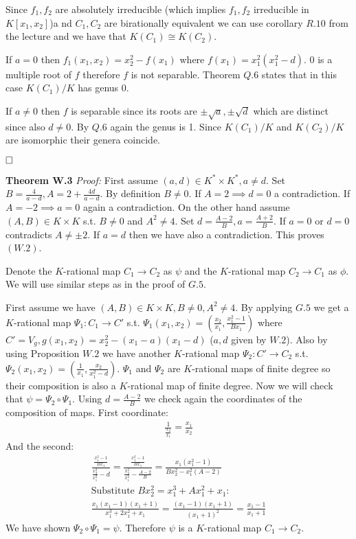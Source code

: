 \documentclass[12pt, a4paper]{article}
\newcommand{\qed}{\hfill\square}
\begin{document}
Since $f_1, f_2$ are absolutely irreducible (which implies $f_1,f_2$ irreducible in $K[x_1,x_2]$)a nd $C_1,C_2$ are birationally equivalent we can use corollary $R.10$ from the lecture and we have that $K(C_1) \cong K(C_2)$.

If $a=0$ then $f_1(x_1,x_2) = x_2^2-f(x_1)$ where $f(x_1) = x_1^2(x_1^2-d)$. $0$ is a multiple root of $f$ therefore $f$ is not separable. Theorem $Q.6$ states that in this case $K(C_1)/K$ has genus 0.

If $a\neq 0$ then $f$ is separable since its roots are $\pm \sqrt{a}, \pm \sqrt{d}$ which are distinct since also $d \neq 0$. By $Q.6$ again the genus is 1. Since $K(C_1)/K$ and $K(C_2)/K$ are isomorphic their genera coincide.

$\qed$

\textbf{Theorem W.3} \textit{Proof:}
First assume $(a,d) \in K^* \times K^*, a \neq d$. Set $B = \frac{4}{a-d}, A = 2+\frac{4d}{a-d}$. By definition $B \neq 0$. If $A = 2 \implies d = 0$ a contradiction. If $A = -2 \implies a = 0$ again a contradiction. On the other hand assume $(A,B) \in K \times K$ s.t. $B \neq 0$ and $A^2 \neq 4$. Set $d = \frac{A-2}{B}, a = \frac{A+2}{B}$. If $a=0$ or $d=0$ contradicts $A\neq \pm2$. If $a=d$ then we have also a contradiction. This proves $(W.2)$.

Denote the $K$-rational map $C_1 \rightarrow C_2$ as $\psi$ and the $K$-rational map $C_2 \rightarrow C_1$ as $\phi$. We will use similar steps as in the proof of $G.5$.

First assume we have $(A,B) \in K\times K, B \neq 0, A^2 \neq 4$. By applying $G.5$ we get a $K$-rational map $\Psi_1: C_1 \rightarrow C'$ s.t. $\Psi_1(x_1,x_2) = \left( \frac{x_2}{x_1}, \frac{x_1^2-1}{Bx_1}\right)$ where $C' = V_g, g(x_1,x_2) = x_2^2-(x_1-a)(x_1-d)$ ($a,d$ given by $W.2$). Also by using Proposition $W.2$ we have another $K$-rational map $\Psi_2: C' \rightarrow C_2$ s.t. $\Psi_2(x_1,x_2) = \left( \frac{1}{x_1}, \frac{x_2}{x_1^2-d} \right)$. $\Psi_1$ and $\Psi_2$ are $K$-rational maps of finite degree so their composition is also a $K$-rational map of finite degree. Now we will check that $\psi = \Psi_2 \circ \Psi_1$. Using $d = \frac{A-2}{B}$ we check again the coordinates of the composition of maps. First coordinate:
\begin{gather*}
\frac{1}{\frac{x_2}{x_1}} = \frac{x_1}{x_2}
\end{gather*}
And the second:
\begin{gather*}
\frac{\frac{x_1^2-1}{Bx_1}}{\frac{x_2^2}{x_1^2}-d} = \frac{\frac{x_1^2-1}{Bx_1}}{\frac{x_2^2}{x_1^2}-\frac{A-2}{B}} = \frac{x_1(x_1^2-1)}{Bx_2^2-x_1^2(A-2)}\\
\text{Substitute $Bx_2^2 = x_1^3+Ax_1^2+x_1$:}\\
\frac{x_1(x_1-1)(x_1+1)}{x_1^3+2x_1^2+x_1} = \frac{(x_1-1)(x_1+1)}{(x_1+1)^2} = \frac{x_1-1}{x_1+1}
\end{gather*}
We have shown $\Psi_2 \circ \Psi_1 = \psi$. Therefore $\psi$ is a $K$-rational map $C_1 \rightarrow C_2$.
\end{document}
